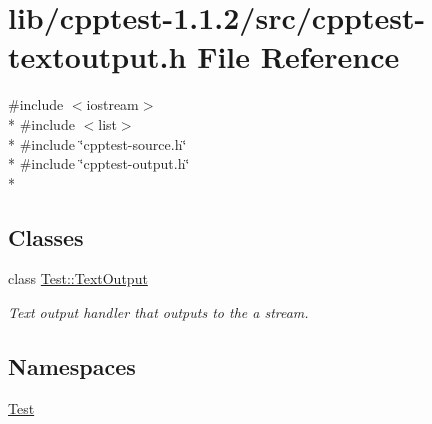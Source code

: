 \hypertarget{cpptest-textoutput_8h}{}\section{lib/cpptest-\/1.1.2/src/cpptest-\/textoutput.h File Reference}
\label{cpptest-textoutput_8h}
{\ttfamily \#include $<$iostream$>$}\\*
{\ttfamily \#include $<$list$>$}\\*
{\ttfamily \#include \char`\"{}cpptest-\/source.\+h\char`\"{}}\\*
{\ttfamily \#include \char`\"{}cpptest-\/output.\+h\char`\"{}}\\*
\subsection*{Classes}
\begin{DoxyCompactItemize}
\item 
class \hyperlink{class_test_1_1_text_output}{Test\+::\+Text\+Output}
\begin{DoxyCompactList}\small\item\em Text output handler that outputs to the a stream. \end{DoxyCompactList}\end{DoxyCompactItemize}
\subsection*{Namespaces}
\begin{DoxyCompactItemize}
\item 
 \hyperlink{namespace_test}{Test}
\end{DoxyCompactItemize}
